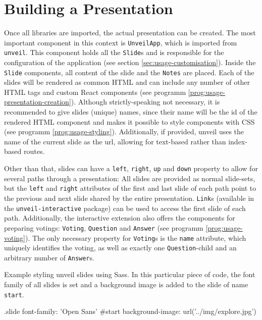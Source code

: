 \section{Building a Presentation}
\label{sec:usage-components}

Once all libraries are imported, the actual presentation can be created. The most important component in this context is \texttt{UnveilApp}, which is imported from \texttt{unveil}. This component holds all the \texttt{Slide}s and is responsible for the configuration of the application (see section \ref{sec:usage-customisation}). Inside the \texttt{Slide} components, all content of the slide and the \texttt{Notes} are placed. Each of the slides will be rendered as common HTML and can include any number of other HTML tags and custom React components (see programm \ref{prog:usage-presentation-creation}). Although strictly-speaking not necessary, it is recommended to give slides (unique) names, since their name will be the id of the rendered HTML component and makes it possible to style components with CSS (see programm \ref{prog:usage-styling}). Additionally, if provided, unveil uses the name of the current slide as the url, allowing for text-based rather than index-based routes.

Other than that, slides can have a \texttt{left}, \texttt{right}, \texttt{up} and \texttt{down} property to allow for several paths through a presentation: All slides are provided as normal slide-sets, but the \texttt{left} and \texttt{right} attributes of the first and last slide of each path point to the previous and next slide shared by the entire presentation. \texttt{Link}s (available in the \texttt{unveil-interactive} package) can be used to access the first slide of each path. Additionally, the interactive extension also offers the components for preparing votings: \texttt{Voting}, \texttt{Question} and \texttt{Answer} (see programm \ref{prog:usage-voting}). The only necessary property for \texttt{Voting}s is the \texttt{name} attribute, which uniquely identifies the voting, as well as exactly one \texttt{Question}-child and an arbitrary number of \texttt{Answer}s.

\begin{program}
\caption{Example styling unveil slides using Sass. In this particular piece of code, the font family of all slides is set and a background image is added to the slide of name \texttt{start}.}
\label{prog:usage-styling}
\begin{CssCode}
.slide
  font-family: 'Open Sans'
#start
  background-image: url('../img/explore.jpg')
\end{CssCode}
\end{program}

